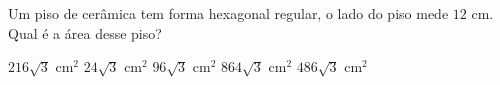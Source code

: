 \noindent\parbox{\linewidth}{

Um piso de cerâmica tem forma hexagonal regular, o lado do piso mede $12$ cm. Qual é a área desse piso?

$216\sqrt{3}$ cm$^2$
$24\sqrt{3}$ cm$^2$
$96\sqrt{3}$ cm$^2$
$864\sqrt{3}$ cm$^2$
$486\sqrt{3}$ cm$^2$



}


